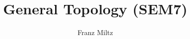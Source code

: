 \documentclass{article}
\begin{document}
\mkthmstwounified
\title{General Topology (SEM7)}
\author{Franz Miltz}
\maketitle
\tableofcontents
\pagebreak
\end{document}
